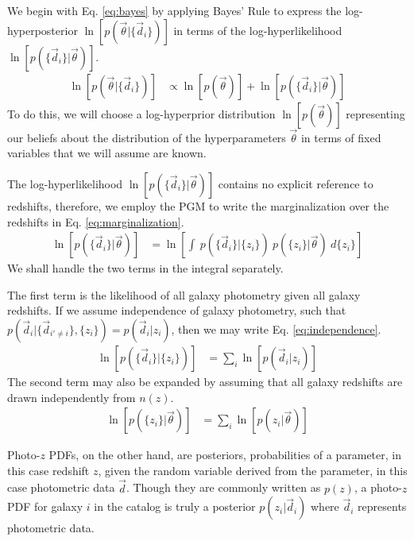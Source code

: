 \documentclass[preprint]{aastex}
\begin{document}
We begin with Eq. \ref{eq:bayes} by applying Bayes' Rule to express the log-hyperposterior $\ln\left[p(\vec{\theta}|\{\vec{d}_{i}\})\right]$ in terms of the log-hyperlikelihood $\ln\left[p(\{\vec{d}_{i}\}|\vec{\theta})\right]$.
\begin{align}
\label{eq:bayes}
\ln\left[p(\vec{\theta}|\{\vec{d}_{i}\})\right] &\propto \ln\left[p(\vec{\theta})\right] + \ln\left[p(\{\vec{d}_{i}\}|\vec{\theta})\right]
\end{align}
To do this, we will choose a log-hyperprior distribution $\ln\left[p(\vec{\theta})\right]$ representing our beliefs about the distribution of the hyperparameters $\vec{\theta}$ in terms of fixed variables that we will assume are known.

The log-hyperlikelihood $\ln\left[p(\{\vec{d}_{i}\}|\vec{\theta})\right]$ contains no explicit reference to redshifts, therefore, we employ the PGM to write the marginalization over the redshifts in Eq. \ref{eq:marginalization}.
\begin{align}
\label{eq:marginalization}
\ln\left[p(\{\vec{d}_{i}\}|\vec{\theta})\right] &= \ln\left[\int\ p(\{\vec{d}_{i}\}|\{z_{i}\})\ p(\{z_{i}\}|\vec{\theta})\ d\{z_{i}\}\right]
\end{align}
We shall handle the two terms in the integral separately.

The first term is the likelihood of all galaxy photometry given all galaxy redshifts.  If we assume independence of galaxy photometry, such that $p(\vec{d}_{i}|\{\vec{d}_{i'\neq i}\}, \{z_{i}\})=p(\vec{d}_{i}|z_{i})$, then we may write Eq. \ref{eq:independence}.
\begin{align}
\label{eq:independence}
\ln\left[p(\{\vec{d}_{i}\}|\{z_{i}\})\right] &= \sum_{i}\ln\left[p(\vec{d}_{i}|z_{i})\right]
\end{align}
The second term may also be expanded by assuming that all galaxy redshifts are drawn independently from $n(z)$.
\begin{align}
\label{eq:poisson}
\ln\left[p(\{z_{i}\}|\vec{\theta})\right] &= \sum_{i}\ln\left[p(z_{i}|\vec{\theta})\right]
\end{align}



Photo-$z$ PDFs, on the other hand, are posteriors, probabilities of a parameter, in this case redshift $z$, given the random variable derived from the parameter, in this case photometric data $\vec{d}$.  Though they are commonly written as $p(z)$, a photo-$z$ PDF for galaxy $i$ in the catalog is truly a posterior $p(z_{i}|\vec{d}_{i})$ where $\vec{d}_{i}$ represents photometric data.
\end{document}
